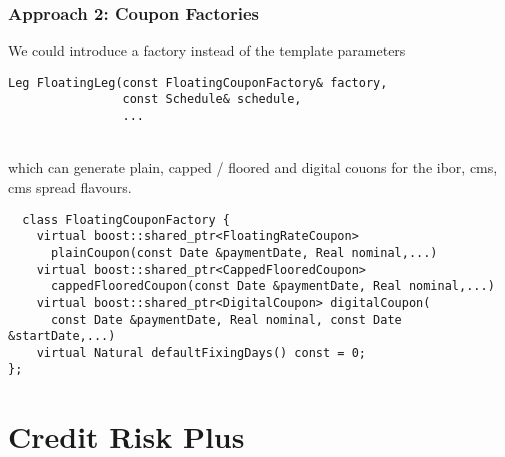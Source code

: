 \documentclass{beamer}
\begin{document}
\begin{frame}[fragile]
\frametitle{Approach 2: Coupon Factories}
We could introduce a factory instead of the template parameters
\vspace{2mm}
\begin{verbatim}
Leg FloatingLeg(const FloatingCouponFactory& factory,
                const Schedule& schedule,
                ...
\end{verbatim}
\\
\vspace{2mm}
which can generate plain, capped / floored and digital
couons for the ibor, cms, cms spread flavours.
\vspace{2mm}
\begin{verbatim}
  class FloatingCouponFactory {
    virtual boost::shared_ptr<FloatingRateCoupon>
      plainCoupon(const Date &paymentDate, Real nominal,...)
    virtual boost::shared_ptr<CappedFlooredCoupon>
      cappedFlooredCoupon(const Date &paymentDate, Real nominal,...)
    virtual boost::shared_ptr<DigitalCoupon> digitalCoupon(
      const Date &paymentDate, Real nominal, const Date &startDate,...)
    virtual Natural defaultFixingDays() const = 0;
};
\end{verbatim}

\end{frame}


\section{Credit Risk Plus}
\end{document}
